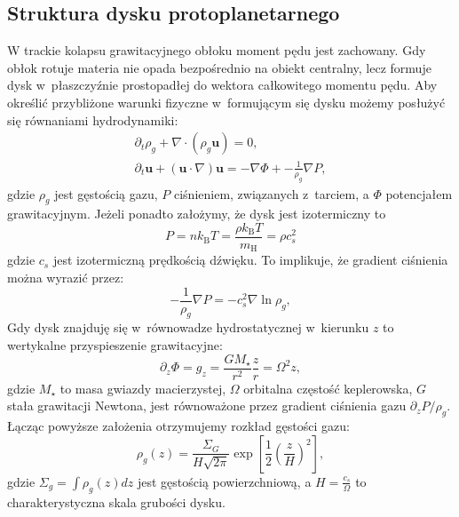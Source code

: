\subsection{Struktura dysku protoplanetarnego}
W trackie kolapsu grawitacyjnego obłoku moment pędu jest zachowany. Gdy obłok
rotuje materia nie opada bezpośrednio na obiekt centralny, lecz formuje dysk
w~płaszczyźnie prostopadłej do wektora całkowitego momentu pędu. Aby określić
przybliżone warunki fizyczne w~formującym się dysku możemy posłużyć się
równaniami hydrodynamiki:
%
\begin{gather}
   \partial_t \rho_g + \nabla\cdot\left(\rho_g\mathbf{u}\right) = 0,
   \label{eq:hd1}\\
\partial_t \mathbf{u} + \left(\mathbf{u}\cdot\nabla\right)\mathbf{u} = 
-\nabla\Phi + -\frac{1}{\rho_g} \nabla P, \label{eq:hd2}
\end{gather}
%
gdzie $\rho_g$ jest gęstością gazu, $P$ ciśnieniem, 
związanych z~tarciem, a $\Phi$ potencjałem grawitacyjnym. Jeżeli ponadto
założymy, że dysk jest izotermiczny to
\begin{equation}
   P = n k_{\textrm{B}} T = \frac{\rho k_{\textrm{B}} T}{m_{\textrm{H}}} = \rho
   c_s^2 
\end{equation}
gdzie $c_s$ jest izotermiczną prędkością dźwięku. To implikuje, że gradient
ciśnienia można wyrazić przez:
\begin{equation}
   -\frac{1}{\rho_g}\nabla P = -c_s^2\nabla\ln\rho_g,
\end{equation}
%
Gdy dysk znajduję się w~równowadze hydrostatycznej w~kierunku $z$ to wertykalne
przyspieszenie grawitacyjne:
%
\begin{equation}
   \partial_z \Phi = g_z = \frac{GM_\star}{r^2}\frac{z}{r} = \Omega^2 z,
\end{equation} 
%
gdzie $M_\star$ to masa gwiazdy macierzystej, $\Omega$ orbitalna częstość
keplerowska, $G$ stała grawitacji Newtona, jest równoważone przez gradient
ciśnienia gazu $\partial_z P / \rho_g$.
Łącząc powyższe założenia otrzymujemy rozkład gęstości gazu:
%
\begin{equation} \label{eq:zeq}
   \rho_g(z) = \frac{\Sigma_G}{H\sqrt{2\pi}} \exp \left[
   \frac{1}{2}\left(\frac{z}{H}\right)^2 \right],
\end{equation}
%
gdzie $\Sigma_g = \int \rho_g(z) dz$ jest gęstością powierzchniową, a
$H=\frac{c_s}{\Omega}$ to charakterystyczna skala grubości dysku.
%
